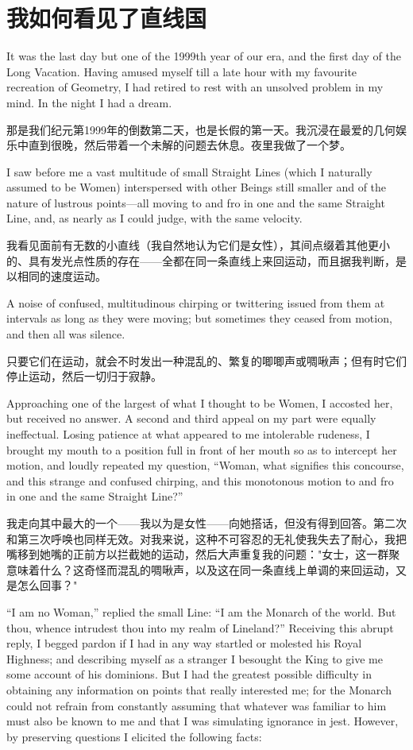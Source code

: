 \documentclass[12pt,UTF8]{ctexbook}
\begin{document}
\chapter{我如何看见了直线国}

It was the last day but one of the 1999th year of our era, and the first day of the Long Vacation. Having amused myself till a late hour with my favourite recreation of Geometry, I had retired to rest with an unsolved problem in my mind. In the night I had a dream.

那是我们纪元第1999年的倒数第二天，也是长假的第一天。我沉浸在最爱的几何娱乐中直到很晚，然后带着一个未解的问题去休息。夜里我做了一个梦。

I saw before me a vast multitude of small Straight Lines (which I naturally assumed to be Women) interspersed with other Beings still smaller and of the nature of lustrous points---all moving to and fro in one and the same Straight Line, and, as nearly as I could judge, with the same velocity.

我看见面前有无数的小直线（我自然地认为它们是女性），其间点缀着其他更小的、具有发光点性质的存在——全都在同一条直线上来回运动，而且据我判断，是以相同的速度运动。

A noise of confused, multitudinous chirping or twittering issued from them at intervals as long as they were moving; but sometimes they ceased from motion, and then all was silence.

只要它们在运动，就会不时发出一种混乱的、繁复的唧唧声或啁啾声；但有时它们停止运动，然后一切归于寂静。

Approaching one of the largest of what I thought to be Women, I accosted her, but received no answer. A second and third appeal on my part were equally ineffectual. Losing patience at what appeared to me intolerable rudeness, I brought my mouth to a position full in front of her mouth so as to intercept her motion, and loudly repeated my question, ``Woman, what signifies this concourse, and this strange and confused chirping, and this monotonous motion to and fro in one and the same Straight Line?''

我走向其中最大的一个——我以为是女性——向她搭话，但没有得到回答。第二次和第三次呼唤也同样无效。对我来说，这种不可容忍的无礼使我失去了耐心，我把嘴移到她嘴的正前方以拦截她的运动，然后大声重复我的问题："女士，这一群聚意味着什么？这奇怪而混乱的啁啾声，以及这在同一条直线上单调的来回运动，又是怎么回事？"

``I am no Woman,'' replied the small Line: ``I am the Monarch of the world. But thou, whence intrudest thou into my realm of Lineland?'' Receiving this abrupt reply, I begged pardon if I had in any way startled or molested his Royal Highness; and describing myself as a stranger I besought the King to give me some account of his dominions. But I had the greatest possible difficulty in obtaining any information on points that really interested me; for the Monarch could not refrain from constantly assuming that whatever was familiar to him must also be known to me and that I was simulating ignorance in jest. However, by preserving questions I elicited the following facts:
\end{document}
